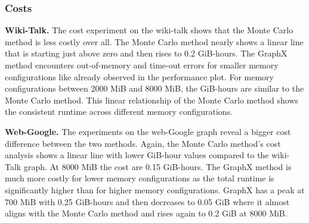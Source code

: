 \subsubsection{Costs}
\textbf{Wiki-Talk.} The cost experiment on the wiki-talk shows that the Monte Carlo method is less costly over all. The Monte Carlo method nearly shows a linear line that is starting just above zero and then rises to 0.2 GiB-hours. The GraphX method encounters out-of-memory and time-out errors for smaller memory configurations like already observed in the performance plot. For memory configurations between 2000 MiB and 8000 MiB, the GiB-hours are similar to the Monte Carlo method. This linear relationship of the Monte Carlo method shows the consistent runtime across different memory configurations.\par

\textbf{Web-Google.} The experiments on the web-Google graph reveal a bigger cost difference between the two methods. Again, the Monte Carlo method's cost analysis shows a linear line with lower GiB-hour values compared to the wiki-Talk graph. At 8000 MiB the cost are 0.15 GiB-hours. The GraphX method is much more costly for lower memory configurations as the total runtime is significantly higher than for higher memory configurations. GraphX has a peak at 700 MiB with 0.25 GiB-hours and then decreases to 0.05 GiB where it almost aligns with the Monte Carlo method and rises again to 0.2 GiB at 8000 MiB. \par





